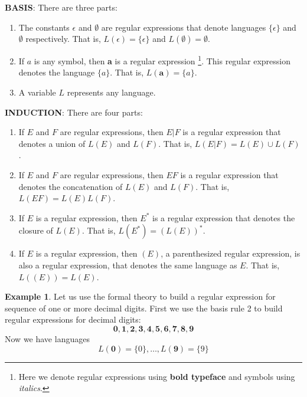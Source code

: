 \documentclass[a4paper,oneside,11pt]{book}
\theoremstyle{definition}
\newtheorem{exmp}{Example}[section]
\begin{document}
\begin{flushleft}
\textbf{BASIS}: There are three parts:
\begin{enumerate}
\item
The constants $\epsilon$ and $\emptyset$ are regular expressions that denote languages $\{\epsilon\}$ and $\emptyset$ respectively.
That is, $L(\epsilon) = \{\epsilon\}$ and $L(\emptyset) = \emptyset$.

\item
If $a$ is any symbol, then \textbf{a}
is a regular expression \footnote{Here we denote regular expressions using \textbf{bold typeface} and symbols using \emph{italics}.}.
This regular expression denotes the language $\{a\}$.
That is, $L(\textbf{a}) = \{a\}$.

\item
A variable $L$ represents any language.
\end{enumerate}

\textbf{INDUCTION}: There are four parts:
\begin{enumerate}
\item
If $E$ and $F$ are regular expressions, then $E | F$ is a regular expression that denotes a union of $L(E)$ and $L(F)$.
That is, $L(E | F) = L(E) \cup L(F)$.

\item
If $E$ and $F$ are regular expressions, then $EF$ is a regular expression that denotes the concatenation of $L(E)$ and $L(F)$.
That is, $L(EF) = L(E)L(F)$.

\item
If $E$ is a regular expression, then $E^*$ is a regular expression that denotes the closure of $L(E)$. That is, $L(E^*) = (L(E))^*$.

\item
If $E$ is a regular expression, then $(E)$, a parenthesized regular expression, is also a regular expression,
that denotes the same language as $E$. That is, $L((E)) = L(E)$.

\end{enumerate}

\begin{exmp}

Let us use the formal theory to build a regular expression for sequence of one or more decimal digits.
First we use the basis rule 2 to build regular expressions for decimal digits:
$$\textbf{0}, \textbf{1}, \textbf{2}, \textbf{3}, \textbf{4}, \textbf{5}, \textbf{6}, \textbf{7}, \textbf{8}, \textbf{9}$$
Now we have languages $$L(\textbf{0}) = \{0\}, \ldots, L(\textbf{9}) = \{9\}$$


\end{exmp}
\end{flushleft}
\end{document}
